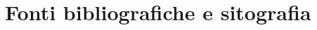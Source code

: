\documentclass[a4paper,10pt,oneside]{book}
\begin{document}
\frontmatter




\mainmatter





\backmatter
\nocite{*}
\chapter{Fonti bibliografiche e sitografia}
\renewcommand{\bibsection}{}

\listoffigures
\end{document}
